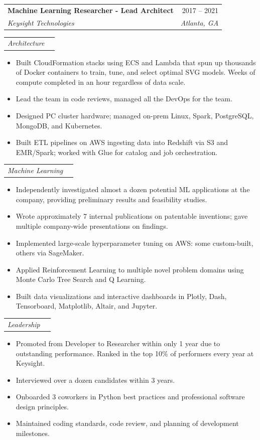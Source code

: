 \documentclass[letterpaper,11pt]{article}
\makeatletter
\newcommand{\resumeItem}[1]{
  \item\small{
    {#1 \vspace{-2pt}}
  }
}
\newcommand{\resumeSubheading}[4]{
  \vspace{-2pt}\item
    \begin{tabular*}{0.97\textwidth}[t]{l@{\extracolsep{\fill}}r}
      \textbf{#1} & #2 \\
      \textit{\small#3} & \textit{\small #4} \\
    \end{tabular*}\vspace{-7pt}
}
\newcommand{\resumeSubSubheading}[2]{
    \item
    \begin{tabular*}{0.97\textwidth}{l@{\extracolsep{\fill}}r}
      \textit{\small#1} & \textit{\small #2} \\
    \end{tabular*}\vspace{-7pt}
}
\newcommand{\resumeSubHeadingListEnd}{\end{itemize}}
\newcommand{\resumeItemListStart}{\begin{itemize}}
\newcommand{\resumeItemListEnd}{\end{itemize}\vspace{-5pt}}
\makeatother
\begin{document}
    \resumeSubheading
      {Machine Learning Researcher - Lead Architect}{2017 -- 2021}
      {Keysight Technologies}{Atlanta, GA}
      \resumeSubSubheading
      {Architecture}{}
      \resumeItemListStart
        \resumeItem{Built CloudFormation stacks using ECS and Lambda that spun up
          thousands of Docker containers to train, tune, and select optimal SVG models.
          Weeks of compute completed in an hour regardless of data scale.}
        \resumeItem{Lead the team in code reviews, managed all the DevOps for
          the team.}
        \resumeItem{Designed PC cluster hardware; managed on-prem Linux, Spark, PostgreSQL, MongoDB, and Kubernetes.}
        \resumeItem{Built ETL pipelines on AWS ingesting data into Redshift via S3 and EMR/Spark; worked with Glue for catalog and job orchestration.}
      \resumeItemListEnd
      \resumeSubSubheading
      {Machine Learning}{}
      \resumeItemListStart
        \resumeItem{Independently investigated almost a dozen potential ML
          applications at the company, providing preliminary results and
          feasibility studies.}
        \resumeItem{Wrote approximately 7 internal publications on patentable
          inventions; gave multiple company-wide presentations on findings.}
        \resumeItem{Implemented large-scale hyperparameter tuning on AWS: some custom-built, others via SageMaker.}
        \resumeItem{Applied Reinforcement Learning to multiple novel problem
          domains using Monte Carlo Tree Search and Q Learning.}
        \resumeItem{Built data visualizations and interactive dashboards in Plotly, Dash, Tensorboard, Matplotlib, Altair, and Jupyter.}
      \resumeItemListEnd
      \resumeSubSubheading
      {Leadership}{}
      \resumeItemListStart
        \resumeItem{Promoted from Developer to Researcher within only 1 year
          due to outstanding performance. Ranked in the top 10\% of performers every year at Keysight.}
        \resumeItem{Interviewed over a dozen candidates within 3 years.}
        \resumeItem{Onboarded 3 coworkers in Python best practices and
          professional software design principles.}
        \resumeItem{Maintained coding standards, code review, and planning of
          development milestones.}
      \resumeItemListEnd


\end{document}
